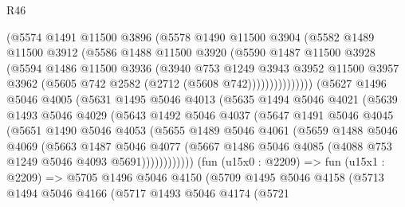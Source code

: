 \begin{lexlean}{R46}
\begin{coremodule}
                  (@5574
                    @1491
                    @11500
                    @3896
                    (@5578
                      @1490
                      @11500
                      @3904
                      (@5582
                        @1489
                        @11500
                        @3912
                        (@5586
                          @1488
                          @11500
                          @3920
                          (@5590
                            @1487
                            @11500
                            @3928
                            (@5594
                              @1486
                              @11500
                              @3936
                              (@3940
                                @753
                                @1249
                                @3943
                                @3952
                                @11500
                                @3957
                                @3962
                                (@5605 @742 @2582 (@2712 (@5608 @742)))))))))))))))
        (@5627
          @1496
          @5046
          @4005
          (@5631
            @1495
            @5046
            @4013
            (@5635
              @1494
              @5046
              @4021
              (@5639
                @1493
                @5046
                @4029
                (@5643
                  @1492
                  @5046
                  @4037
                  (@5647
                    @1491
                    @5046
                    @4045
                    (@5651
                      @1490
                      @5046
                      @4053
                      (@5655
                        @1489
                        @5046
                        @4061
                        (@5659
                          @1488
                          @5046
                          @4069
                          (@5663
                            @1487
                            @5046
                            @4077
                            (@5667 @1486 @5046 @4085 (@4088 @753 @1249 @5046 @4093 @5691))))))))))))
        (fun (u15x0 : @2209) =>
        fun (u15x1 : @2209) =>
        @5705
          @1496
          @5046
          @4150
          (@5709
            @1495
            @5046
            @4158
            (@5713
              @1494
              @5046
              @4166
              (@5717
                @1493
                @5046
                @4174
                (@5721

\end{coremodule}
\end{lexlean}
